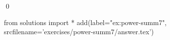 
\begin{ex} 
  \label{ex:power-summ7}
  
  \qed
\end{ex} 
\begin{python0}
from solutions import *
add(label="ex:power-summ7",
    srcfilename='exercises/power-summ7/answer.tex') 
\end{python0}
